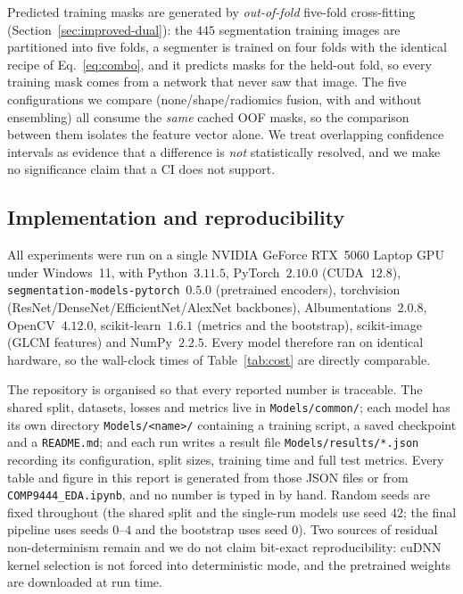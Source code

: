 \documentclass[11pt]{article}
\begin{document}
Predicted training masks are generated by \emph{out-of-fold} five-fold
cross-fitting (Section~\ref{sec:improved-dual}): the $445$ segmentation training
images are partitioned into five folds, a segmenter is trained on four folds with
the identical recipe of Eq.~\ref{eq:combo}, and it predicts masks for the held-out
fold, so every training mask comes from a network that never saw that image. The
five configurations we compare (none/shape/radiomics fusion, with and without
ensembling) all consume the \emph{same} cached OOF masks, so the comparison between
them isolates the feature vector alone. We treat overlapping
confidence intervals as evidence that a difference is \emph{not} statistically
resolved, and we make no significance claim that a CI does not support.

\subsection{Implementation and reproducibility}
\label{sec:setup-impl}
All experiments were run on a single NVIDIA GeForce RTX~5060 Laptop GPU under
Windows~11, with Python~$3.11.5$, PyTorch~$2.10.0$ (CUDA~$12.8$),
\texttt{segmentation-models-pytorch}~$0.5.0$ (pretrained encoders),
torchvision (ResNet/DenseNet/EfficientNet/AlexNet backbones),
Albumentations~$2.0.8$, OpenCV~$4.12.0$, scikit-learn~$1.6.1$ (metrics and the
bootstrap), scikit-image (GLCM features) and NumPy~$2.2.5$. Every model therefore
ran on identical hardware, so the wall-clock times of Table~\ref{tab:cost} are
directly comparable.

The repository is organised so that every reported number is traceable. The shared
split, datasets, losses and metrics live in \texttt{Models/common/}; each model has
its own directory \texttt{Models/<name>/} containing a training script, a saved
checkpoint and a \texttt{README.md}; and each run writes a result file
\texttt{Models/results/*.json} recording its configuration, split sizes, training
time and full test metrics. Every table and figure in this report is generated
from those JSON files or from \texttt{COMP9444\_EDA.ipynb}, and no number is typed
in by hand. Random seeds are fixed throughout (the shared split and the
single-run models use seed $42$; the final pipeline uses seeds $0$--$4$ and the
bootstrap uses seed $0$). Two sources of residual non-determinism remain and we
do not claim bit-exact reproducibility: cuDNN kernel selection is not forced into
deterministic mode, and the pretrained weights are downloaded at run time.
\end{document}

